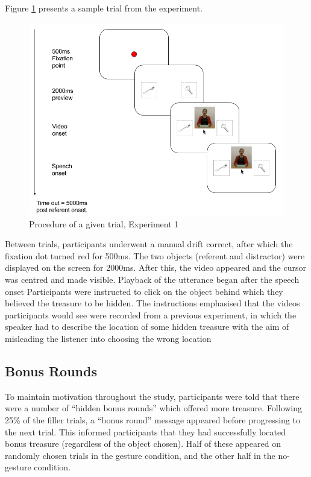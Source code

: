 \documentclass[a4paper,man,natbib]{apa6}
\begin{document}
Figure \ref{fig:v1_trial} presents a sample trial from the experiment. 
\begin{figure}[Ht]
  \centering
	\includegraphics[width=\linewidth]{./img/e7_trial.png}
  \caption{Procedure of a given trial, Experiment 1}
  \label{fig:v1_trial}
\end{figure}
Between trials, participants underwent a manual drift correct, after which the fixation dot turned red for 500ms. 
The two objects (referent and distractor) were displayed on the screen for 2000ms.
After this, the video appeared and the cursor was centred and made visible.
Playback of the utterance began after the speech onset 
Participants were instructed to click on the object behind which they believed the treasure to be hidden.
The instructions emphasised that the videos participants would see were recorded from a previous experiment, in which the speaker had to describe the location of some hidden treasure with the aim of misleading the listener into choosing the wrong location %

\subsection{Bonus Rounds}
To maintain motivation throughout the study, participants were told that there were a number of ``hidden bonus rounds'' which offered more treasure. 
Following 25\% of the filler trials, a ``bonus round'' message appeared before progressing to the next trial.
This informed participants that they had successfully located bonus treasure (regardless of the object chosen).
Half of these appeared on randomly chosen trials in the gesture condition, and the other half in the no-gesture condition.
\end{document}
